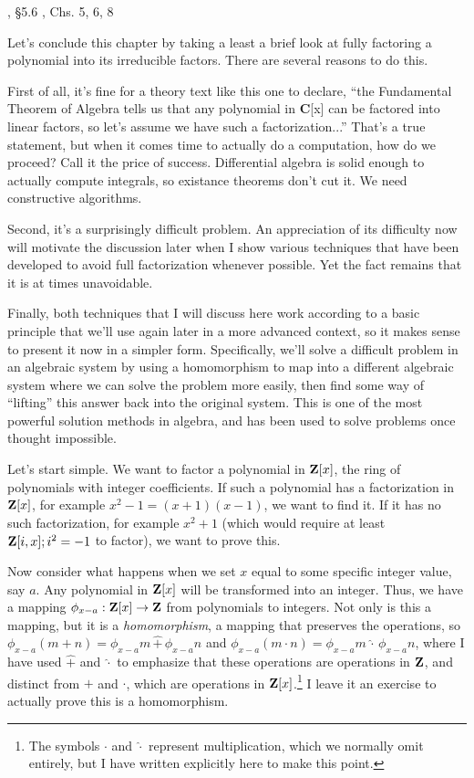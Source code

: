 , \S5.6
\hbox{}\qquad [Geddes], Chs. 5, 6, 8

Let's conclude this chapter by taking a least a brief look at fully
factoring a polynomial into its irreducible factors.  There are
several reasons to do this.

First of all, it's fine for a theory text like this one to declare,
``the Fundamental Theorem of Algebra tells us that any polynomial in
{\bf C}[x] can be factored into linear factors, so let's assume we
have such a factorization...''  That's a true statement, but when it
comes time to actually do a computation, how do we proceed?  Call it
the price of success.  Differential algebra is solid enough to
actually compute integrals, so existance theorems don't cut it.  We
need constructive algorithms.

Second, it's a surprisingly difficult problem.  An appreciation of its
difficulty now will motivate the discussion later when I show various
techniques that have been developed to avoid full factorization
whenever possible.  Yet the fact remains that it is at times
unavoidable.

Finally, both techniques that I will discuss here work according to a
basic principle that we'll use again later in a more advanced context,
so it makes sense to present it now in a simpler form.  Specifically,
we'll solve a difficult problem in an algebraic system by using a
homomorphism to map into a different algebraic system where we can
solve the problem more easily, then find some way of ``lifting'' this
answer back into the original system.  This is one of the most
powerful solution methods in algebra, and has been used to solve
problems once thought impossible.

Let's start simple.  We want to factor a polynomial in ${\bf Z}[x]$,
the ring of polynomials with integer coefficients.  If such a
polynomial has a factorization in ${\bf Z}[x]$, for example
$x^2-1=(x+1)(x-1)$, we want to find it.  If it has no such
factorization, for example $x^2+1$ (which would require at least ${\bf
Z}[i,x]; i^2=-1$ to factor), we want to prove this.

Now consider what happens when we set $x$ equal to some specific
integer value, say $a$.  Any polynomial in ${\bf Z}[x]$ will be
transformed into an integer.  Thus, we have a mapping $\phi_{x-a}:
{\bf Z}[x] \rightarrow {\bf Z}$ from polynomials to integers.  Not
only is this a mapping, but it is a {\it homomorphism}, a mapping that
preserves the operations, so $\phi_{x-a} (m+n) = \phi_{x-a}m \,\hat+\,
\phi_{x-a}n$ and $\phi_{x-a} (m\cdot n) = \phi_{x-a}m \,\hat\cdot\,
\phi_{x-a}n$, where I have used $\hat+$ and $\hat\cdot$ to emphasize
that these operations are operations in ${\bf Z}$, and distinct from
$+$ and $\cdot$, which are operations in ${\bf Z}[x]$.\footnote{The
symbols $\cdot$ and $\hat\cdot$ represent multiplication, which we normally
omit entirely, but I have written explicitly here to make this point.}
I leave it an exercise to actually prove this is a homomorphism.

